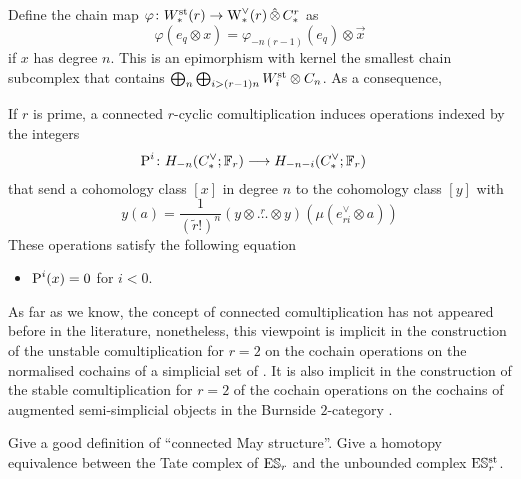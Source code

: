 Define the chain map $\varphi\colon \Wst(r)\to \rWd(r)\hotimes \rucadenas$ as 
\[
	\varphi(e_q\otimes x) = \varphi_{-n(r-1)}(e_{q})\otimes \vec{x}
\]
if $x$ has degree $n$. This is an epimorphism with kernel the smallest chain subcomplex that contains $\bigoplus_n\bigoplus_{i>(r-1)n} \Wst[i]\otimes \ucadenas[n]$. As a consequence,



\begin{proposition}
	If $r$ is prime, a connected $r$-cyclic comultiplication induces operations indexed by the integers
	\begin{align*}
		\power^{i}\colon H_{-n}(\ucocadenas;\mathbb{F}_r)&\lra H_{-n-i}(\ucocadenas;\mathbb{F}_r)
	\end{align*}
	that send a cohomology class $[x]$ in degree $n$ to the cohomology class $[y]$ with
	\[
	y(a) = \frac{1}{(\tilde{r}!)^n}(y\otimes \overset{r}{\ldots}\otimes y)(\mu(e_{ri}^\vee\otimes a))
	\]
	These operations satisfy the following equation
	\begin{itemize}
		\item $\power^i(x) = 0$ for $i<0$.
	\end{itemize}
\end{proposition}

\begin{example}
As far as we know, the concept of connected comultiplication has not appeared before in the literature, nonetheless, this viewpoint is implicit in the construction of the unstable comultiplication for $r=2$ on the cochain operations on the normalised cochains of a simplicial set of \cite{medina2021fast_sq}. It is also implicit in the construction of the stable comultiplication for $r=2$ of the cochain operations on the cochains of augmented semi-simplicial objects in the Burnside $2$-category \cite{cantero-moran2020khovanov}.
\end{example}

\begin{question}
	Give a good definition of ``connected May structure''. Give a homotopy equivalence between the Tate complex of $\ES_r$ and the unbounded complex $\ESst_r$.
\end{question}


